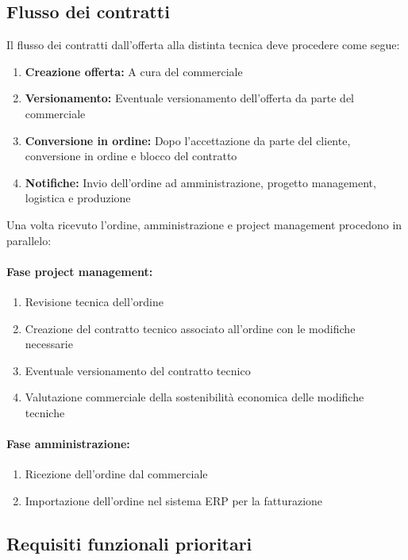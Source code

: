 \documentclass[12pt, a4paper]{article}
\begin{document}
\subsection{Flusso dei contratti}

Il flusso dei contratti dall'offerta alla distinta tecnica deve procedere come segue:

\begin{enumerate}
      \item \textbf{Creazione offerta:} A cura del commerciale
      \item \textbf{Versionamento:} Eventuale versionamento dell'offerta da parte del commerciale
      \item \textbf{Conversione in ordine:} Dopo l'accettazione da parte del cliente, conversione in ordine e blocco del contratto
      \item \textbf{Notifiche:} Invio dell'ordine ad amministrazione, progetto management, logistica e produzione
\end{enumerate}

Una volta ricevuto l'ordine, amministrazione e project management procedono in parallelo:

\paragraph{Fase project management:}
\begin{enumerate}
      \item Revisione tecnica dell'ordine
      \item Creazione del contratto tecnico associato all'ordine con le modifiche necessarie
      \item Eventuale versionamento del contratto tecnico
      \item Valutazione commerciale della sostenibilità economica delle modifiche tecniche
\end{enumerate}

\paragraph{Fase amministrazione:}
\begin{enumerate}
      \item Ricezione dell'ordine dal commerciale
      \item Importazione dell'ordine nel sistema ERP per la fatturazione
\end{enumerate}

\subsection{Requisiti funzionali prioritari}
\end{document}
